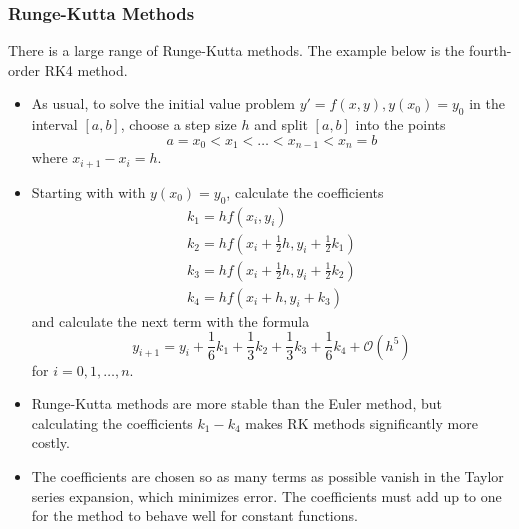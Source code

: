 \documentclass[11pt, a4paper]{article}
\begin{document}
\subsubsection{Runge-Kutta Methods}
There is a large range of Runge-Kutta methods. The example below is the fourth-order RK4 method.
\begin{itemize}
	\item As usual, to solve the initial value problem $ y' = f(x, y),  y(x_{0}) = y_{0} $ in the interval $ [a, b] $, choose a step size $ h $ and split $ [a, b] $ into the points
	\begin{equation*}
		a = x_0 < x_1 < \dots < x_{n-1} < x_{n} = b
	\end{equation*}
	where $ x_{i+1} - x_{i} = h$.
	
	\item Starting with with $ y(x_{0}) = y_{0}$, calculate the coefficients 
	\begin{align*}
		 k_{1} = hf(x_{i}, y_{i}) \\
		 k_{2} = hf(x_{i} + \frac{1}{2}h, y_{i} + \frac{1}{2} k_{1}) \\
		 k_{3} = hf(x_{i} + \frac{1}{2}h, y_{i} + \frac{1}{2} k_{2}) \\
		 k_{4} = hf(x_{i} + h, y_{i} + k_{3})
\end{align*}
	and calculate the next term with the formula
	\begin{equation*}
		y_{i+1} = y_{i} + \frac{1}{6}k_{1} + \frac{1}{3}k_{2} + \frac{1}{3}k_{3} + \frac{1}{6}k_{4} + \mathcal{O}(h^{5})
	\end{equation*}
	for $ i = 0, 1, \ldots, n $.

	\item Runge-Kutta methods are more stable than the Euler method, but calculating the coefficients $ k_{1}-k_{4} $ makes RK methods significantly more costly.
	
	\item The coefficients are chosen so as many terms as possible vanish in the Taylor series expansion, which minimizes error. The coefficients must add up to one for the method to behave well for constant functions. 

\end{itemize}
\end{document}
